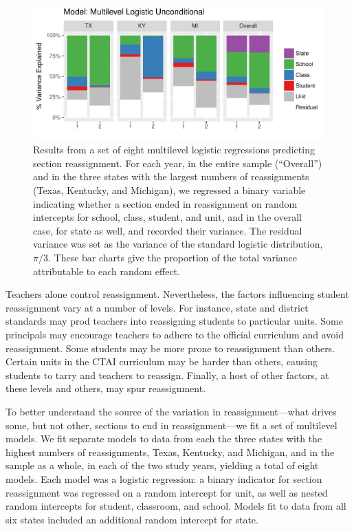 \documentclass[12pt]{article}\usepackage[]{graphicx}\usepackage[]{color}
\makeatletter
\def\maxwidth{ %
  \ifdim\Gin@nat@width>\linewidth
    \linewidth
  \else
    \Gin@nat@width
  \fi
}
\makeatother
\begin{document}
\begin{figure}
  \centering

\includegraphics[width=\maxwidth]{figure/vcs-1} 

\caption{Results from a set of eight multilevel logistic regressions
  predicting section reassignment. For each year, in the entire sample (``Overall'')
  and in the three states with the largest numbers of reassignments (Texas,
  Kentucky, and Michigan), we regressed a binary variable indicating
  whether a section ended in reassignment on random intercepts for
  school, class, student, and unit, and in the overall case, for state
  as well, and recorded their variance. The residual variance was set
  as the variance of the standard logistic distribution,
  $\pi/3$. These bar charts give the proportion of the total variance
  attributable to each random effect.}
\label{fig:vc}
\end{figure}
Teachers alone control reassignment.
Nevertheless, the factors influencing student reassignment vary at a
number of levels.
For instance, state and district standards may prod teachers into
reassigning students to particular units.
Some principals may encourage teachers to adhere to the official
curriculum and avoid reassignment.
Some students may be more prone to reassignment than others.
Certain units in the CTAI curriculum may be harder than others,
causing students to tarry and teachers to reassign.
Finally, a host of other factors, at these levels and others, may spur reassignment.

To better understand the source of the variation in
reassignment---what drives some, but not other, sections to end in
reassignment---we fit a set of multilevel models.
We fit separate models to data from each the three states with the highest numbers of reassignments, Texas,
Kentucky, and Michigan, and in the sample as a whole, in each of the
two study years, yielding a total of eight models.
Each model was a logistic regression: a binary indicator for section
reassignment was regressed on a random intercept for unit, as well as
nested random intercepts for student, classroom, and school.
Models fit to data from all six states included an additional random
intercept for state.
\end{document}
